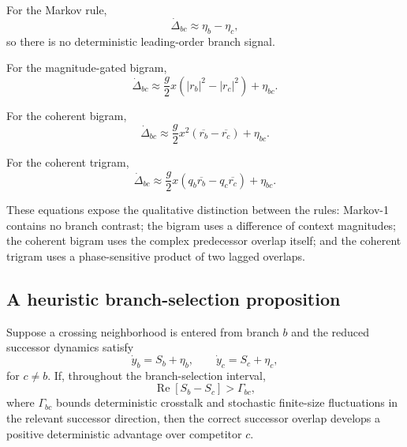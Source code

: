 For the Markov rule,
\begin{equation}
\dot\Delta_{bc}
\approx
\eta_b-\eta_c,
\end{equation}
so there is no deterministic leading-order branch signal.

For the magnitude-gated bigram,
\begin{equation}
\dot\Delta_{bc}
\approx
\frac{g}{2}
x
\left(
|r_b|^2-|r_c|^2
\right)
+
\eta_{bc}.
\label{eq:contrast-bigram}
\end{equation}

For the coherent bigram,
\begin{equation}
\dot\Delta_{bc}
\approx
\frac{g}{2}
x^2
\left(
\overline{r_b}
-
\overline{r_c}
\right)
+
\eta_{bc}.
\label{eq:contrast-cb}
\end{equation}

For the coherent trigram,
\begin{equation}
\dot\Delta_{bc}
\approx
\frac{g}{2}
x
\left(
q_b\overline{r_b}
-
q_c\overline{r_c}
\right)
+
\eta_{bc}.
\label{eq:contrast-ct}
\end{equation}

These equations expose the qualitative distinction between the rules:
Markov-1 contains no branch contrast; the bigram uses a difference of context
magnitudes; the coherent bigram uses the complex predecessor overlap itself;
and the coherent trigram uses a phase-sensitive product of two lagged
overlaps.

\subsection{A heuristic branch-selection proposition}

\begin{proposition}
Suppose a crossing neighborhood is entered from branch $b$ and the reduced
successor dynamics satisfy
\begin{equation}
\dot y_b
=
S_b+\eta_b,
\qquad
\dot y_c
=
S_c+\eta_c,
\end{equation}
for $c\neq b$.  If, throughout the branch-selection interval,
\begin{equation}
\operatorname{Re}
\left[
S_b-S_c
\right]
>
\Gamma_{bc},
\label{eq:branch-sufficient}
\end{equation}
where $\Gamma_{bc}$ bounds deterministic crosstalk and stochastic finite-size
fluctuations in the relevant successor direction, then the correct successor
overlap develops a positive deterministic advantage over competitor $c$.
\end{proposition}

